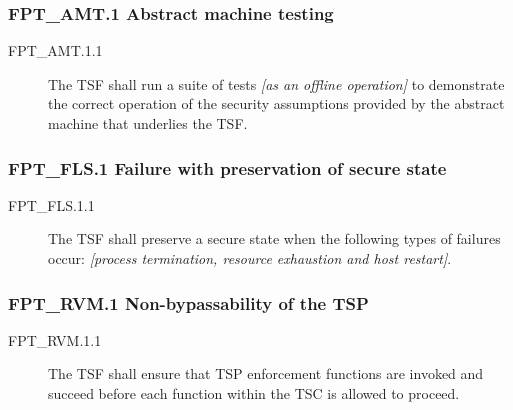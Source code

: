 \documentclass[10pt,a4paper,english]{article}
\begin{document}
\subsubsection*{FPT{\_}AMT.1 Abstract machine testing}
\begin{description}
\item[FPT{\_}AMT.1.1 ]

The TSF shall run a suite of tests \emph{{[}as an offline
operation]} to demonstrate the correct operation of the security
assumptions provided by the abstract machine that underlies the
TSF.

\end{description}



\hypertarget{fpt-fls-1-failure-with-preservation-of-secure-state}{}
\subsubsection*{FPT{\_}FLS.1 Failure with preservation of secure state}
\begin{description}
\item[FPT{\_}FLS.1.1 ]

The TSF shall preserve a secure state when the following types of
failures occur: \emph{{[}process termination, resource
exhaustion and host restart]}.

\end{description}



\hypertarget{fpt-rvm-1-non-bypassability-of-the-tsp}{}
\subsubsection*{FPT{\_}RVM.1 Non-bypassability of the TSP}
\begin{description}
\item[FPT{\_}RVM.1.1 ]

The TSF shall ensure that TSP enforcement functions are invoked
and succeed before each function within the TSC is allowed to
proceed.

\end{description}
\end{document}
